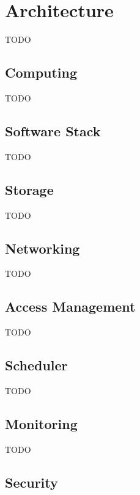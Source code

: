 \section{Architecture}
\label{sec:architecture}

TODO

\subsection{Computing}
\label{ssec:computing}

TODO

\subsection{Software Stack}
\label{ssec:software-stack}

TODO

\subsection{Storage}
\label{ssec:storage}

TODO

\subsection{Networking}
\label{ssec:networking}

TODO

\subsection{Access Management}
\label{ssec:access-management}

TODO

\subsection{Scheduler}
\label{ssec:scheduler}

TODO

\subsection{Monitoring}
\label{ssec:monitoring}

TODO

\subsection{Security}
\label{ssec:security}

